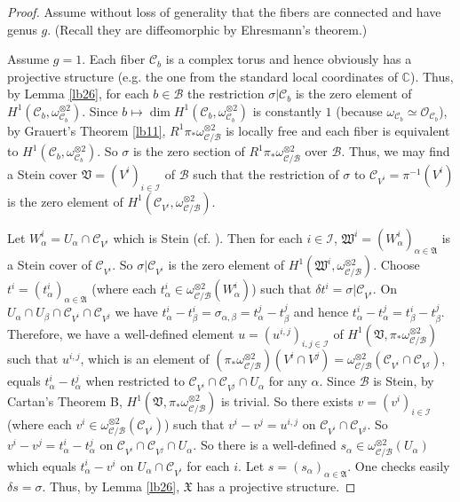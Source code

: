 \documentclass[12pt,a4paper,notitlepage]{article}
\theoremstyle{definition}
\theoremstyle{plain}
\newcommand{\fk}{\mathfrak}
\newcommand{\mc}{\mathcal}
\newcommand{\scr}{\mathscr}
\newcommand{\mbb}{\mathbb}
\numberwithin{equation}{section}
\begin{document}
\begin{proof}
Assume without loss of generality that the fibers are connected and have genus $g$. (Recall they are diffeomorphic by Ehresmann's theorem.) 
	
Assume $g=1$. Each fiber $\mc C_b$ is a complex torus and hence obviously has a projective structure (e.g. the one from the standard local coordinates of $\mbb C$). Thus, by Lemma \ref{lb26}, for each $b\in\mc B$ the restriction $\sigma|\mc C_b$ is the zero element of $H^1(\mc C_b,\omega_{\mc C_b}^{\otimes 2})$. Since $b\mapsto \dim H^1(\mc C_b,\omega_{\mc C_b}^{\otimes 2})$ is constantly $1$ (because $\omega_{\mc C_b}\simeq \scr O_{\mc C_b}$), by Grauert's Theorem \ref{lb11}, $R^1\pi_*\omega_{\mc C/\mc B}^{\otimes 2}$ is locally free and each fiber is equivalent to $H^1(\mc C_b,\omega_{\mc C_b}^{\otimes 2})$. So $\sigma$ is the zero section of $R^1\pi_*\omega_{\mc C/\mc B}^{\otimes 2}$ over $\mc B$. Thus, we may find a Stein cover $\fk V=(V^i)_{i\in\mc I}$ of $\mc B$ such that  the restriction of $\sigma$ to $\mc C_{V^i}=\pi^{-1}(V^i)$ is the zero element of $H^1(\mc C_{V^i},\omega_{\mc C/\mc B}^{\otimes 2})$.
	
Let $W_\alpha^i=U_\alpha\cap \mc C_{V^i}$ which is Stein (cf. \cite[Sec. 1.4.4]{GR84}). Then for each $i\in\mc I$, $\fk W^i=(W_\alpha^i)_{\alpha\in\fk A}$ is a Stein cover of $\mc C_{V^i}$.  So $\sigma|\mc C_{V^i}$ is the zero element of  $H^1(\fk W^i,\omega_{\mc C/\mc B}^{\otimes 2})$. Choose $t^i=(t^i_\alpha)_{\alpha\in\fk A}$ (where each $t^i_\alpha\in\omega_{\mc C/\mc B}^{\otimes 2}(W_\alpha^i)$) such that $\delta t^i=\sigma|\mc C_{V^i}$. On $U_\alpha\cap U_\beta\cap \mc C_{V^i}\cap \mc C_{V^j}$ we have $t^i_\alpha-t^i_\beta=\sigma_{\alpha,\beta}=t^j_\alpha-t^j_\beta$ and hence $t^i_\alpha-t^j_\alpha=t^i_\beta-t^j_\beta$. Therefore, we have a well-defined element $u=(u^{i,j})_{i,j\in\mc I}$ of $H^1(\fk V,\pi_*\omega_{\mc C/\mc B}^{\otimes 2})$ such that $u^{i,j}$, which is an element of $(\pi_*\omega_{\mc C/\mc B}^{\otimes 2})(V^i\cap V^j)=\omega_{\mc C/\mc B}^{\otimes 2}(\mc C_{V^i}\cap \mc C_{V^j})$, equals $t^i_\alpha-t^j_\alpha$ when restricted to $\mc C_{V^i}\cap \mc C_{V^j}\cap U_\alpha$ for  any $\alpha$. Since $\mc B$ is Stein, by Cartan's Theorem B,  $H^1(\fk V,\pi_*\omega_{\mc C/\mc B}^{\otimes 2})$ is trivial. So there exists $v=(v^i)_{i\in\mc I}$ (where each $v^i\in \omega_{\mc C/\mc B}^{\otimes 2}(\mc C_{V^i})$) such that $v^i-v^j=u^{i,j}$ on $\mc C_{V^i}\cap \mc C_{V^j}$. So $v^i-v^j=t^i_\alpha-t^j_\alpha$ on $\mc C_{V^i}\cap \mc C_{V^j}\cap U_\alpha$. So there is a well-defined $s_\alpha\in\omega_{\mc C/\mc B}^{\otimes 2}(U_\alpha)$ which equals $t^i_\alpha-v^i$ on  $U_\alpha\cap \mc C_{V^i}$ for each $i$. Let $s=(s_\alpha)_{\alpha\in\fk A}$. One checks easily $\delta s=\sigma$. Thus, by Lemma \ref{lb26}, $\fk X$ has a projective structure.
	

\end{proof}
\end{document}
